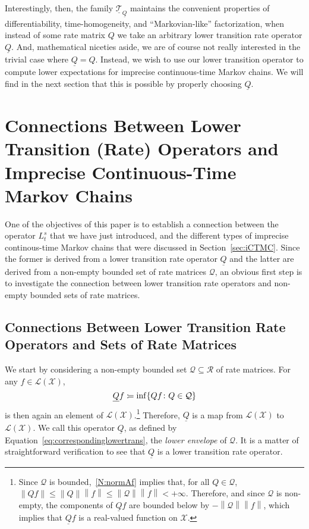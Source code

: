 \documentclass[10pt,a4paper]{paper}
\theoremstyle{definition}
\newcommand{\states}{\mathcal{X}}
\newcommand{\lbound}{L}
\newcommand{\gambles}{\mathcal{L}}
\newcommand{\gamblesX}{\gambles(\states)}
\newcommand{\rateset}{\mathcal{Q}}
\newcommand{\lrate}{\underline{Q}}
\newcommand{\norm}[1]{\left\lVert #1 \right\rVert}
\newcommand{\coloneqq}{:\!=}
\begin{document}
Interestingly, then, the family $\underline{\mathcal{T}}_{\lrate}$ maintains the convenient properties of differentiability, time-homogeneity, and ``Markovian-like'' factorization, when instead of some rate matrix $Q$ we take an arbitrary lower transition rate operator $\lrate$. And, mathematical niceties aside, we are of course not really interested in the trivial case where $\lrate=Q$. Instead, we wish to use our lower transition operator to compute lower expectations for imprecise continuous-time Markov chains. We will find in the next section that this is possible by properly choosing $\lrate$.

\section{Connections Between Lower Transition (Rate) Operators and Imprecise Continuous-Time Markov Chains}\label{sec:connections}

One of the objectives of this paper is to establish a connection between the operator $\lbound_t^s$ that we have just introduced, and the different types of imprecise continous-time Markov chains that were discussed in Section~\ref{sec:iCTMC}. Since the former is derived from a lower transition rate operator $\lrate$ and the latter are derived from a non-empty bounded set of rate matrices $\rateset$, an obvious first step is to investigate the connection between lower transition rate operators and non-empty bounded sets of rate matrices.

\subsection{Connections Between Lower Transition Rate Operators and Sets of Rate Matrices}\label{sec:connections_rate}


We start by considering a non-empty bounded set $\rateset\subseteq\mathcal{R}$ of rate matrices. For any $f\in\gamblesX$,
\begin{equation}\label{eq:correspondinglowertrans}
\lrate f\coloneqq\inf\{Qf\colon Q\in\rateset\}\\[2mm]
\end{equation}
is then again an element of $\gamblesX$.\footnote{%
Since $\rateset$ is bounded,~\ref{N:normAf} implies that, for all $Q\in\rateset$, $\norm{Qf}\leq\norm{Q}\norm{f}\leq\norm{\rateset}\norm{f}<+\infty$. Therefore, and since $\rateset$ is non-empty, the components of $\lrate f$ are bounded below by $-\norm{\rateset}\norm{f}$, which implies that $\lrate f$ is a real-valued function on $\states$.}
Therefore, $\lrate$ is a map from $\gamblesX$ to $\gamblesX$. We call this operator $\lrate$, as defined by Equation~\eqref{eq:correspondinglowertrans}, the \emph{lower envelope} of $\rateset$. It is a matter of straightforward verification to see that $\lrate$ is a lower transition rate operator.
\end{document}

